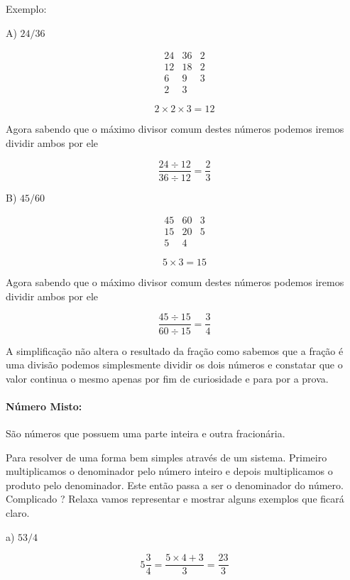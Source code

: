 \documentclass[letterpaper]{book}
\begin{document}
Exemplo:

A) \(24/36\)

\[
\begin{array}{cc|cc}
24 & 36 & 2 \\
12 & 18 & 2 \\
6  & 9  & 3 \\
2  & 3 
\end{array}
\]

\[2 \times 2 \times 3 = 12\]

\vspace{0.5em}

Agora sabendo que o máximo divisor comum destes números podemos iremos dividir ambos por ele

\[\dfrac{24 \div 12}{36 \div 12} = \dfrac{2}{3}\]

\vspace{0.5em}

B) \(45/60\)

\[
\begin{array}{cc|cc}
45 & 60 & 3 \\
15 & 20 & 5 \\
5  & 4 
\end{array}
\]

\[5 \times 3  = 15\]

Agora sabendo que o máximo divisor comum destes números podemos iremos dividir ambos por ele

\[\dfrac{45 \div 15}{60 \div 15} = \dfrac{3}{4}\]

A simplificação não altera o resultado da fração como sabemos que a fração é uma divisão podemos simplesmente dividir os dois números e constatar que o valor continua o mesmo apenas por fim de curiosidade e para por a prova.

\paragraph{Número Misto:} São números que possuem uma parte inteira e outra fracionária.

Para resolver de uma forma bem simples através de um sistema. Primeiro multiplicamos o denominador pelo número inteiro e depois multiplicamos o produto pelo denominador. Este então passa a ser o denominador do número. Complicado ? Relaxa vamos representar e mostrar alguns exemplos que ficará claro.

\vspace{0.5em}

a) \(5 3/4\)

\[5 \dfrac{3}{4} = \dfrac{5 \times 4 + 3}{3} = \dfrac{23}{3}\]
\end{document}
